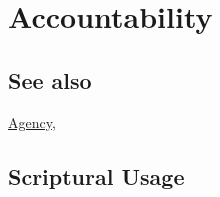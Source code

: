 \section{Accountability}
	\label{ACCOUNTABILITY}
	
\subsection{See also}

	\hyperref[AGENCY]{Agency},





\subsection{Scriptural Usage} %
	\label{ACCOUNTABILITY-SCRIPTURES}

	
	
